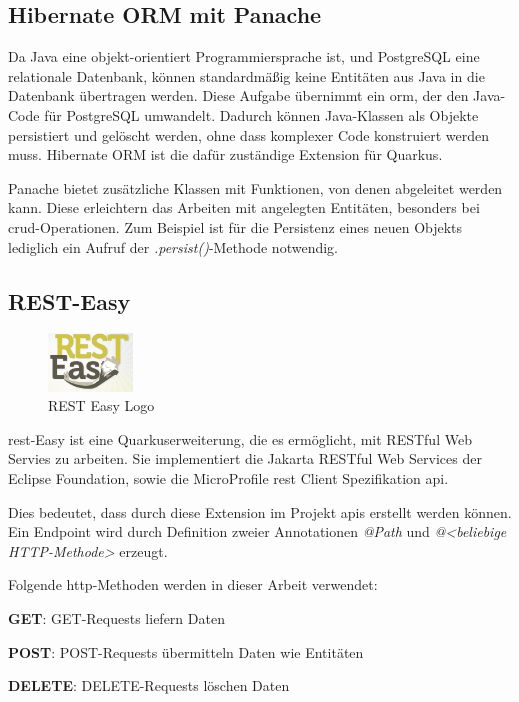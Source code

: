 \subsection{Hibernate ORM mit Panache} 
Da Java eine objekt-orientiert Programmiersprache ist, und PostgreSQL eine relationale Datenbank, können standardmäßig keine Entitäten aus Java in die Datenbank übertragen werden. 
Diese Aufgabe übernimmt ein \gls{orm}, der den Java-Code für PostgreSQL umwandelt. 
Dadurch können Java-Klassen als Objekte persistiert und gelöscht werden, ohne dass komplexer Code konstruiert werden muss. 
Hibernate ORM ist die dafür zuständige Extension für Quarkus. 
\cite{ORMAbout}

Panache bietet zusätzliche Klassen mit Funktionen, von denen abgeleitet werden kann. 
Diese erleichtern das Arbeiten mit angelegten Entitäten, besonders bei \gls{crud}-Operationen.
Zum Beispiel ist für die Persistenz eines neuen Objekts lediglich ein Aufruf der \emph{.persist()}-Methode notwendig.
\cite{HibernateORMwithPanache}

\subsection{REST-Easy}
\label{ch::MavenTool}
\begin{figure}
    \begin{center}
        \includegraphics[width=0.2\textwidth]{pics/logos/resteasy.png}
        \caption{REST Easy Logo}
    \end{center}
\end{figure}
\gls{rest}-Easy ist eine Quarkuserweiterung, die es ermöglicht, mit RESTful Web Servies zu arbeiten. 
Sie implementiert die Jakarta RESTful Web Services der Eclipse Foundation, sowie die MicroProfile \gls{rest} Client Spezifikation \gls{api}.
\cite{ResteasyAbout}

Dies bedeutet, dass durch diese Extension im Projekt \gls{api}s erstellt werden können. 
Ein Endpoint wird durch Definition zweier Annotationen \emph{@Path} und \emph{@<beliebige HTTP-Methode>} erzeugt.
\cite{ResteasyExtensionAbout}

Folgende \gls{http}-Methoden werden in dieser Arbeit verwendet:
\begin{compactitem}
    \item \textbf{GET}: GET-Requests liefern Daten \cite{httpAbout}
    \item \textbf{POST}: POST-Requests übermitteln Daten wie Entitäten \cite{httpAbout}
    \item \textbf{DELETE}: DELETE-Requests löschen Daten \cite{httpAbout}
\end{compactitem}

